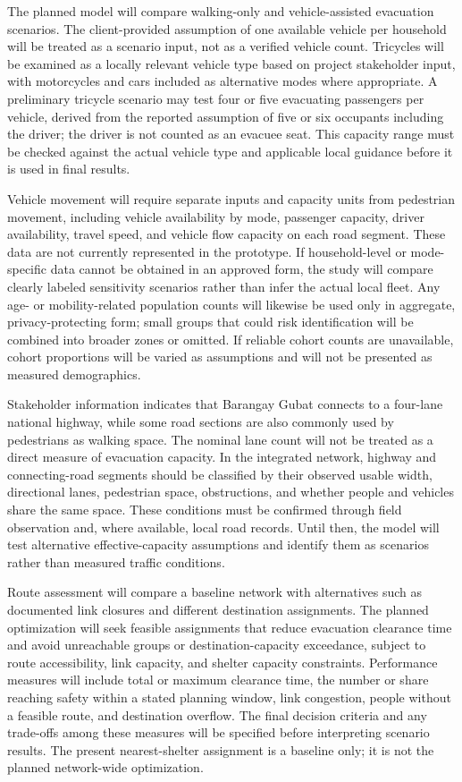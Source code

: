 \documentclass[conference]{IEEEtran}
\begin{document}
The planned model will compare walking-only and vehicle-assisted evacuation scenarios. The client-provided assumption of one available vehicle per household will be treated as a scenario input, not as a verified vehicle count. Tricycles will be examined as a locally relevant vehicle type based on project stakeholder input, with motorcycles and cars included as alternative modes where appropriate. A preliminary tricycle scenario may test four or five evacuating passengers per vehicle, derived from the reported assumption of five or six occupants including the driver; the driver is not counted as an evacuee seat. This capacity range must be checked against the actual vehicle type and applicable local guidance before it is used in final results.

Vehicle movement will require separate inputs and capacity units from pedestrian movement, including vehicle availability by mode, passenger capacity, driver availability, travel speed, and vehicle flow capacity on each road segment. These data are not currently represented in the prototype. If household-level or mode-specific data cannot be obtained in an approved form, the study will compare clearly labeled sensitivity scenarios rather than infer the actual local fleet. Any age- or mobility-related population counts will likewise be used only in aggregate, privacy-protecting form; small groups that could risk identification will be combined into broader zones or omitted. If reliable cohort counts are unavailable, cohort proportions will be varied as assumptions and will not be presented as measured demographics.

Stakeholder information indicates that Barangay Gubat connects to a four-lane national highway, while some road sections are also commonly used by pedestrians as walking space. The nominal lane count will not be treated as a direct measure of evacuation capacity. In the integrated network, highway and connecting-road segments should be classified by their observed usable width, directional lanes, pedestrian space, obstructions, and whether people and vehicles share the same space. These conditions must be confirmed through field observation and, where available, local road records. Until then, the model will test alternative effective-capacity assumptions and identify them as scenarios rather than measured traffic conditions.

Route assessment will compare a baseline network with alternatives such as documented link closures and different destination assignments. The planned optimization will seek feasible assignments that reduce evacuation clearance time and avoid unreachable groups or destination-capacity exceedance, subject to route accessibility, link capacity, and shelter capacity constraints. Performance measures will include total or maximum clearance time, the number or share reaching safety within a stated planning window, link congestion, people without a feasible route, and destination overflow. The final decision criteria and any trade-offs among these measures will be specified before interpreting scenario results. The present nearest-shelter assignment is a baseline only; it is not the planned network-wide optimization.
\end{document}
